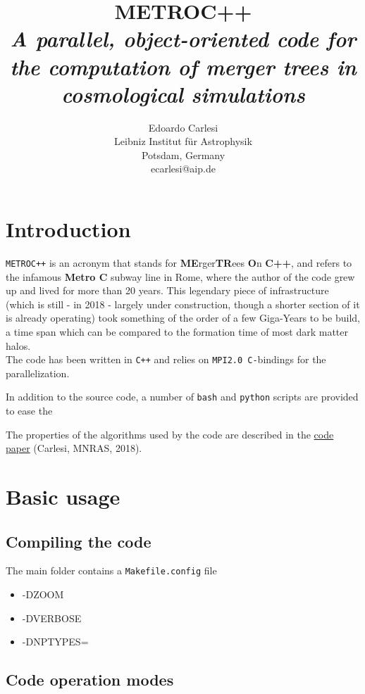 \documentclass{article}
\title{\textbf{METROC++} \\
\emph{A parallel, object-oriented code for the computation of merger trees in 
cosmological simulations}}
\author{Edoardo Carlesi\\ Leibniz Institut f\"ur Astrophysik\\ Potsdam, Germany\\ ecarlesi@aip.de}
\begin{document}
\maketitle
\tableofcontents
\newpage

\section{Introduction}
\texttt{METROC++} is an acronym that stands for \textbf{ME}rger\textbf{TR}ees \textbf{O}n \textbf{C++}, and refers to the 
infamous \textbf{Metro C} subway line in Rome, where the author of the code grew up and lived for more than 20 years.
This legendary piece of infrastructure (which is still - in 2018 - largely under construction, though a shorter section of 
it is already operating) took something of the order of a few Giga-Years to be build, a time span which can be compared to the
formation time of most dark matter halos.\\

The code has been written in \texttt{C++} and relies on \texttt{MPI2.0 C-}bindings for the parallelization.

In addition to the source code, a number of \texttt{bash} and \texttt{python} scripts are provided to ease the 

The properties of the algorithms used by the code are described in the \href{https://arxiv.org/abs/1612.07053}{code paper} (Carlesi, MNRAS, 2018).



\section{Basic usage}
\subsection{Compiling the code}

The main folder contains a \texttt{Makefile.config} file 

\begin{itemize}
\item {-DZOOM}
\item {-DVERBOSE}
\item {-DNPTYPES=}
\end{itemize}

\subsection{Code operation modes}
\end{document}
